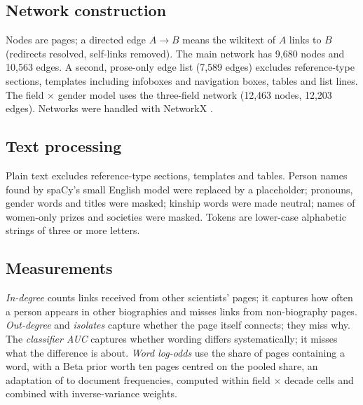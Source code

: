 \documentclass[9pt,twocolumn,twoside,lineno]{pnas-new}
\begin{document}
\subsection*{Network construction}
Nodes are pages; a directed edge $A\to B$ means the wikitext of $A$ links to $B$ (redirects resolved, self-links removed). The main network has 9,680 nodes and 10,563 edges. A second, prose-only edge list (7,589 edges) excludes reference-type sections, templates including infoboxes and navigation boxes, tables and list lines. The field $\times$ gender model uses the three-field network (12,463 nodes, 12,203 edges). Networks were handled with NetworkX \cite{hagberg2008networkx}.

\subsection*{Text processing}
Plain text excludes reference-type sections, templates and tables. Person names found by spaCy's small English model were replaced by a placeholder; pronouns, gender words and titles were masked; kinship words were made neutral; names of women-only prizes and societies were masked. Tokens are lower-case alphabetic strings of three or more letters.

\subsection*{Measurements}
\emph{In-degree} counts links received from other scientists' pages; it captures how often a person appears in other biographies and misses links from non-biography pages. \emph{Out-degree} and \emph{isolates} capture whether the page itself connects; they miss why. The \emph{classifier AUC} captures whether wording differs systematically; it misses what the difference is about. \emph{Word log-odds} use the share of pages containing a word, with a Beta prior worth ten pages centred on the pooled share, an adaptation of \cite{monroe2008fightin} to document frequencies, computed within field $\times$ decade cells and combined with inverse-variance weights.
\end{document}
